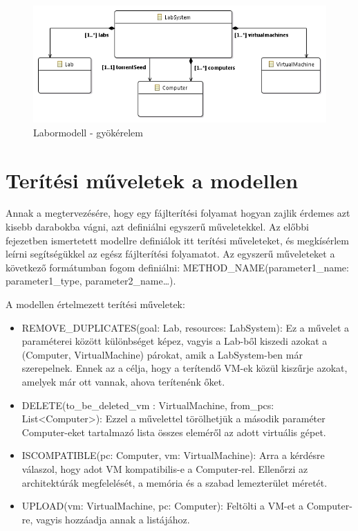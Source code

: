 \begin{figure}[h!]
	\centering
	\includegraphics[width=130mm, keepaspectratio]{figures/design_modelroot.png}
	\caption{Labormodell - gyökérelem}
	\label{fig:designmodelroot}
\end{figure}

\section{Terítési műveletek a modellen}
\label{distrops}

Annak a megtervezésére, hogy egy fájlterítési folyamat hogyan zajlik érdemes azt kisebb darabokba vágni, azt definiálni egyszerű műveletekkel.
Az előbbi fejezetben ismertetett modellre definiálok itt terítési műveleteket, és megkísérlem leírni segítségükkel az egész fájlterítési folyamatot.
Az egyszerű műveleteket a következő formátumban fogom definiálni: METHOD\_NAME(parameter1\_name: parameter1\_type, parameter2\_name\ldots).

A modellen értelmezett terítési műveletek:

\begin{itemize}
  \item REMOVE\_DUPLICATES(goal: Lab, resources: LabSystem): Ez a művelet a paraméterei között különbséget képez, vagyis a Lab-ből kiszedi azokat a (Computer, VirtualMachine) párokat, amik a LabSystem-ben már szerepelnek. Ennek az a célja, hogy a terítendő VM-ek közül kiszűrje azokat, amelyek már ott vannak, ahova terítenénk őket.
  \item DELETE(to\_be\_deleted\_vm : VirtualMachine, from\_pcs: List<Computer>): Ezzel a művelettel törölhetjük a második paraméter Computer-eket tartalmazó lista összes eleméről az adott virtuális gépet.
  \item ISCOMPATIBLE(pc: Computer, vm: VirtualMachine): Arra a kérdésre válaszol, hogy adot VM kompatibilis-e a Computer-rel. Ellenőrzi az architektúrák megfelelését, a memória és a szabad lemezterület méretét.
  \item UPLOAD(vm: VirtualMachine, pc: Computer): Feltölti a VM-et a Computer-re, vagyis hozzáadja annak a  listájához. 
\end{itemize}


